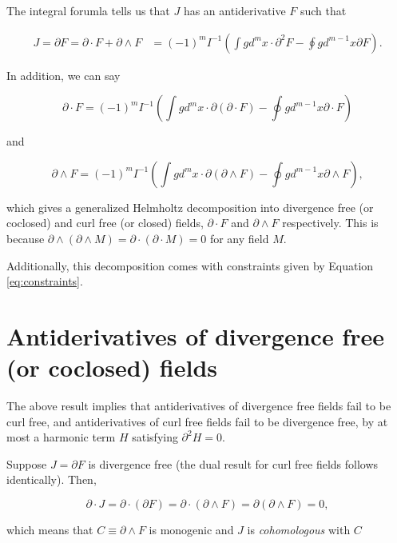 \documentclass{article}
\begin{document}
The integral forumla tells us that $J$ has an antiderivative $F$ such that

\begin{align}
  J = \partial F = \partial \cdot F + \partial \wedge F &= (-1)^m I^{-1} \left(\int g d^{m}x \cdot \partial^2 F - \oint g d^{m-1}x \partial F\right).\label{eq:helmholtz}
\end{align}

In addition, we can say

\begin{equation}
  \partial \cdot F = (-1)^m I^{-1} \left(\int g d^{m}x \cdot \partial (\partial \cdot F) - \oint g d^{m-1}x \partial \cdot F\right)
\end{equation}

and

\begin{equation}
  \partial \wedge F = (-1)^m I^{-1} \left(\int g d^{m}x \cdot \partial (\partial \wedge F) - \oint g d^{m-1}x \partial \wedge F\right),
\end{equation}

which gives a generalized Helmholtz decomposition into divergence free (or coclosed) and curl free (or closed) fields, $\partial \cdot F$ and $\partial \wedge F$ respectively. This is because $\partial \wedge (\partial \wedge M) = \partial \cdot (\partial \cdot M) = 0$ for any field $M$. 

Additionally, this decomposition comes with constraints given by Equation \ref{eq:constraints}.

\section{Antiderivatives of divergence free (or coclosed) fields} The above result implies that antiderivatives of divergence free fields fail to be curl free, and antiderivatives of curl free fields fail to be divergence free, by at most a harmonic term $H$ satisfying $\partial^2 H = 0$.

Suppose $J = \partial F$ is divergence free (the dual result for curl free fields follows identically). Then, 

\begin{equation}
  \partial \cdot J = \partial \cdot (\partial F) = \partial \cdot (\partial \wedge F) = \partial (\partial \wedge F) = 0,
\end{equation}

which means that $C \equiv \partial \wedge F$ is monogenic and $J$ is \emph{cohomologous} with $C$
\end{document}
